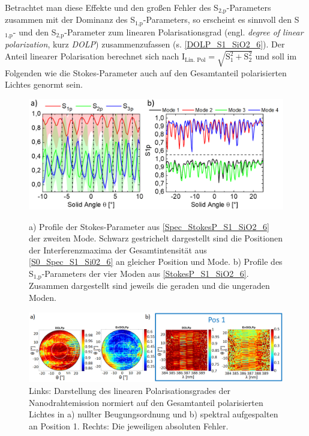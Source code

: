 Betrachtet man diese Effekte und den großen Fehler des S$_\text{2,p}$-Parameters zusammen mit der Dominanz des S$_\text{1,p}$-Parameters, so erscheint es sinnvoll den S$_\text{1,p}$- und den S$_\text{2,p}$-Parameter zum linearen Polarisationsgrad (engl. \textit{degree of linear polarization}, kurz \textit{DOLP}) zusammenzufassen (s. \autoref{DOLP_S1_SiO2_6}). Der Anteil linearer Polarisation berechnet sich nach $\text{I}_\text{Lin. Pol}=\sqrt{\text{S}_\text{1}^\text{2}+\text{S}_\text{2}^\text{2}}$ und soll im Folgenden wie die Stokes-Parameter auch auf den Gesamtanteil polarisierten Lichtes genormt sein.\begin{figure}[b]
\includegraphics[width=.66\textwidth]{Bilder/SiO2/SpecP1_StokesP_Line_S1_Si02_6}
\caption{a) Profile der Stokes-Parameter aus \autoref{Spec_StokesP_S1_SiO2_6} der zweiten Mode. Schwarz gestrichelt dargestellt sind die Positionen der Interferenzmaxima der Gesamtintensität aus \autoref{S0_Spec_S1_Si02_6} an gleicher Position und Mode. b) Profile des S$_\text{1,p}$-Parameters der vier Moden aus \autoref{StokesP_S1_SiO2_6}. Zusammen dargestellt sind jeweils die geraden und die ungeraden Moden.} 
\label{SpecP1_StokesP_Line_S1_Si02_6}
\includegraphics[width=1\textwidth]{Bilder/SiO2/DOLP_SiO2_S1_6}
\caption{Links: Darstellung des linearen Polarisationsgrades der Nanodrahtemission normiert auf den Gesamtanteil polarisierten Lichtes in a) nullter Beugungsordnung und b) spektral aufgespalten an Position 1. Rechts: Die jeweiligen absoluten Fehler.}
\label{DOLP_S1_SiO2_6}
\end{figure}
